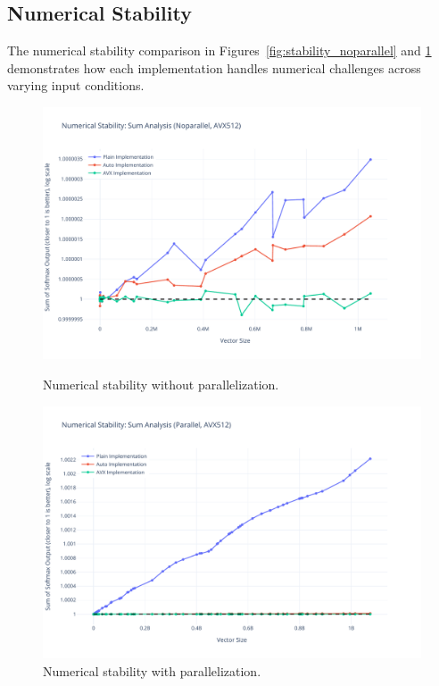\documentclass[10pt]{article}
\begin{document}
\subsection*{Numerical Stability}
The numerical stability comparison in Figures~\ref{fig:stability_noparallel} and \ref{fig:stability_parallel} demonstrates how each implementation handles numerical challenges across varying input conditions.

\begin{figure}[H]
  \centering
  \begin{minipage}{0.48\textwidth}
    \centering
    \includegraphics[width=\textwidth]{../images/stability/stability_noparallel_avx512.pdf}
    \caption{Numerical stability without parallelization.}
    \label{fig:stability_noparallel}
  \end{minipage}
  \hfill
  \begin{minipage}{0.48\textwidth}
    \centering
    \includegraphics[width=\textwidth]{../images/stability/stability_parallel_avx512.pdf}
    \caption{Numerical stability with parallelization.}
    \label{fig:stability_parallel}
  \end{minipage}
\end{figure}
\end{document}
